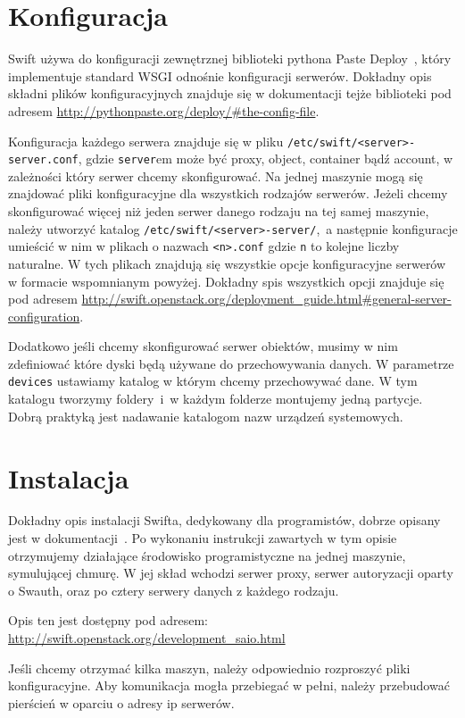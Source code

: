 \section{Konfiguracja}\label{sec:konfiguracja}

Swift używa do konfiguracji zewnętrznej biblioteki pythona Paste Deploy~\cite{paste_deploy}, który implementuje standard WSGI odnośnie konfiguracji serwerów. Dokładny opis składni plików konfiguracyjnych znajduje się w dokumentacji tejże biblioteki pod adresem \url{http://pythonpaste.org/deploy/#the-config-file}. 

Konfiguracja każdego serwera znajduje się w pliku \texttt{/etc/swift/<server>-server.conf}, gdzie \texttt{server}em może być proxy, object, container bądź account, w zależności który serwer chcemy skonfigurować. Na jednej maszynie mogą się znajdować pliki konfiguracyjne dla wszystkich rodzajów serwerów. Jeżeli chcemy skonfigurować więcej niż jeden serwer danego rodzaju na tej samej maszynie, należy utworzyć katalog \texttt{/etc/swift/<server>-server/},~a następnie konfiguracje umieścić w nim w plikach o nazwach \texttt{<n>.conf} gdzie \texttt{n} to kolejne liczby naturalne. W tych plikach znajdują się wszystkie opcje konfiguracyjne serwerów w formacie wspomnianym powyżej. Dokładny spis wszystkich opcji znajduje się pod adresem \url{http://swift.openstack.org/deployment_guide.html#general-server-configuration}.

Dodatkowo jeśli chcemy skonfigurować serwer obiektów, musimy w nim zdefiniować które dyski będą używane do przechowywania danych. W parametrze \texttt{devices} ustawiamy katalog w którym chcemy przechowywać dane. W tym katalogu tworzymy foldery~i~w każdym folderze montujemy jedną partycje. Dobrą praktyką jest nadawanie katalogom nazw urządzeń systemowych.

\section{Instalacja}\label{sec:instalacja}

Dokładny opis instalacji Swifta, dedykowany dla programistów, dobrze opisany jest w dokumentacji~\cite{swift_doc}. Po wykonaniu instrukcji zawartych w tym opisie otrzymujemy działające środowisko programistyczne na jednej maszynie, symulującej chmurę. W jej skład wchodzi serwer proxy, serwer autoryzacji oparty o Swauth, oraz po cztery serwery danych z każdego rodzaju.

Opis ten jest dostępny pod adresem: \url{http://swift.openstack.org/development_saio.html}

Jeśli chcemy otrzymać kilka maszyn, należy odpowiednio rozproszyć pliki konfiguracyjne. Aby komunikacja mogła przebiegać w pełni, należy przebudować pierścień w oparciu o adresy ip serwerów.



	

